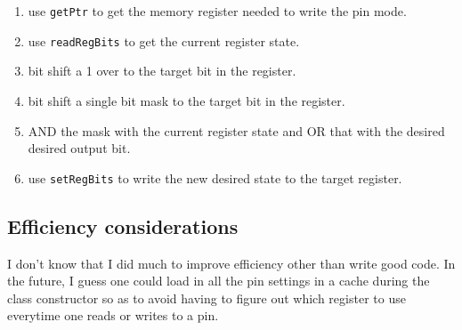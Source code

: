 \documentclass{article}
\begin{document}
\begin{itemize}
		\begin{enumerate}
			\item use \texttt{getPtr} to get the memory register needed to write the pin mode.
			\item use \texttt{readRegBits} to get the current register state.
			\item bit shift a 1 over to the target bit in the register. 
			\item bit shift a single bit mask to the target bit in the register.
			\item AND the mask with the current register state and OR that with the desired desired output bit.
			\item use \texttt{setRegBits} to write the new desired state to the target register. 
		\end{enumerate}
\end{itemize}

\subsection{Efficiency considerations}
I don't know that I did much to improve efficiency other than write good code. In the future, I guess one could load in all the pin settings in a cache during the class constructor so as to avoid having to figure out which register to use everytime one reads or writes to a pin.
\end{document}

